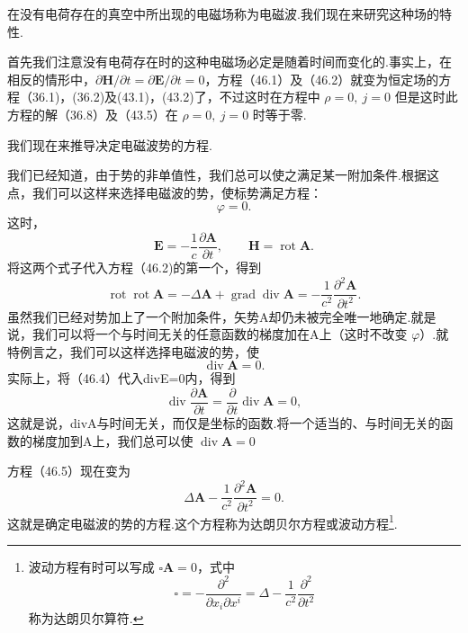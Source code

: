 在没有电荷存在的真空中所出现的电磁场称为电磁波.我们现在来研究这种场的特性.

首先我们注意没有电荷存在时的这种电磁场必定是随着时间而变化的.事实上，在相反的情形中，$\partial\boldsymbol{H}/\partial t=\partial\boldsymbol{E}/\partial t = 0$，方程（46.1）及（46.2）就变为恒定场的方程（36.1)，(36.2)及(43.1)，(43.2)了，不过这时在方程中 $\rho = 0,\ j = 0$ 但是这时此方程的解（36.8）及（43.5）在 $\rho = 0,\ j = 0$ 时等于零.

我们现在来推导决定电磁波势的方程.

我们已经知道，由于势的非单值性，我们总可以使之满足某一附加条件.根据这点，我们可以这样来选择电磁波的势，使标势满足方程：
\begin{equation}
  \varphi=0.
\end{equation}
这时，
\begin{equation}
  \boldsymbol{E}=-\frac{1}{c}\frac{\partial\boldsymbol{A}}{\partial t},
  \qquad\boldsymbol{H}=\operatorname{rot}\boldsymbol{A}.
\end{equation}
将这两个式子代入方程（46.2)的第一个，得到
\begin{equation}
  \operatorname{rot}\operatorname{rot}\boldsymbol{A}
  =-\Delta\boldsymbol{A}+\operatorname{grad}\operatorname{div}\boldsymbol{A}
  =-\frac{1}{c^2}\frac{\partial^2\boldsymbol{A}}{\partial t^2}.
\end{equation}
虽然我们已经对势加上了一个附加条件，矢势A却仍未被完全唯一地确定.就是说，我们可以将一个与时间无关的任意函数的梯度加在A上（这时不改变 $\varphi$）.就特例言之，我们可以这样选择电磁波的势，使
\begin{equation}
  \operatorname{div}\boldsymbol{A}=0.
\end{equation}
实际上，将（46.4）代入divE=0内，得到
\begin{equation*}
  \operatorname{div}\frac{\partial\boldsymbol{A}}{\partial t}
  =\frac{\partial}{\partial t}\operatorname{div}\boldsymbol{A}=0,
\end{equation*}
这就是说，divA与时间无关，而仅是坐标的函数.将一个适当的、与时间无关的函数的梯度加到A上，我们总可以使 $\operatorname{div}\boldsymbol{A} = 0$

方程（46.5）现在变为
\begin{equation}
  \Delta\boldsymbol{A}-\frac{1}{c^2}\frac{\partial^2\boldsymbol{A}}{\partial t^2}=0.
\end{equation}
这就是确定电磁波的势的方程.这个方程称为达朗贝尔方程或波动方程\footnote{波动方程有时可以写成 $\square\boldsymbol{A}=0$，式中
\begin{equation*}
  \square=-\frac{\partial^2}{\partial x_i\partial x^i}=\Delta-\frac{1}{c^2}\frac{\partial^2}{\partial t^2}
\end{equation*}
称为达朗贝尔算符.}.


